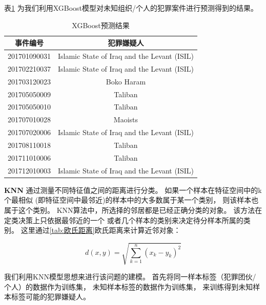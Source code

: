 \documentclass[bwprint]{gmcmthesis}
\begin{document}
表\ref{tab:xgboost预测结果}
为我们利用XGBoost模型对未知组织/个人的犯罪案件进行预测得到的结果。

\begin{table}
\centering
\caption{XGBoost预测结果}
\begin{tabular}{|c|c|}
  \hline
  事件编号 & 犯罪嫌疑人 \\
  \hline
  201701090031 & Islamic State of Iraq and the Levant (ISIL)  \\
  \hline
  201702210037 & Islamic State of Iraq and the Levant (ISIL) \\
  \hline
  201703120023 & Boko Haram \\
  \hline
  201705050009 & Taliban \\
  \hline
  201705050010 & Taliban \\
  \hline
  201707010028 & Maoists  \\
  \hline
  201707020006 & Islamic State of Iraq and the Levant (ISIL)  \\
  \hline
  201708110018 & Taliban  \\
  \hline
  201711010006 & Taliban  \\
  \hline
  201712010003 &  Islamic State of Iraq and the Levant (ISIL)  \\
  \hline
\end{tabular}
\label{tab:xgboost预测结果}
\end{table}

\textbf{KNN}
通过测量不同特征值之间的距离进行分类。
如果一个样本在特征空间中的k个最相似
(即特征空间中最邻近)的样本中的大多数属于某一个类别，
则该样本也属于这个类别。
KNN算法中，所选择的邻居都是已经正确分类的对象。
该方法在定类决策上只依据最邻近的一个
或者几个样本的类别来决定待分样本所属的类别。
这里通过\ref{tab:欧氏距离}欧氏距离来计算近邻对象：

\begin{equation}
  d(x,y) = \sqrt{\sum_{k=1}^n (x_k - y_k)^2}
  \label{tab:欧氏距离}
\end{equation}

我们利用KNN模型思想来进行该问题的建模。
首先将同一样本标签（犯罪团伙/个人）的数据作为训练集，
未知样本标签的数据作为训练集，
来训练得到未知样本标签可能的犯罪嫌疑人。
\end{document}

